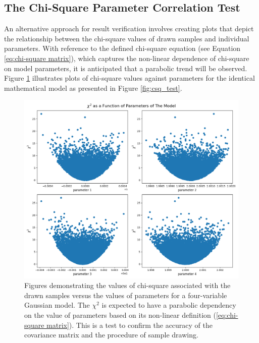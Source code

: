 \documentclass[12pt, TexShade, letterpaper]{report}
\begin{document}
\subsection{The Chi-Square Parameter Correlation Test}
\label{chap:method,sub:test,subsub:plot}
An alternative approach for result verification involves creating plots that depict the relationship between the chi-square values of drawn samples and individual parameters. With reference to the defined chi-square equation (see Equation \ref{eq:chi-square matrix}), which captures the non-linear dependence of chi-square on model parameters, it is anticipated that a parabolic trend will be observed. Figure \ref{fig:csq_params} illustrates plots of chi-square values against parameters for the identical mathematical model as presented in Figure \ref{fig:csq_test}. \par
\begin{figure}[h!]
\centering
\includegraphics[scale =0.5]{csq_vs_params.png}
\caption[Chi-Square vs. parameters plots]{Figures demonstrating the values of chi-square associated with the drawn samples versus the values of parameters for a four-variable Gaussian model. The $\chi^2$ is expected to have a parabolic dependency on the value of parameters based on its non-linear definition (\ref{eq:chi-square matrix}). This is a test to confirm the accuracy of the covariance matrix and the procedure of sample drawing.}
\label{fig:csq_params}
\end{figure}
\end{document}
